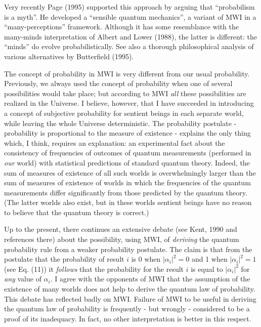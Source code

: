 \documentclass[12pt]{article}
\begin{document}
Very recently Page (1995)  supported this approach by arguing  that
``probabilism is a myth''. He developed a ``sensible quantum
mechanics'', a variant of MWI in a ``many-perceptions'' framework.
Although it has some resemblance with the many-minds interpretation of
Albert and Lower (1988), the latter is different: the
``minds'' do evolve probabilistically. See also a thorough
philosophical analysis of various alternatives by
Butterfield (1995).

        

The concept of probability in MWI is very different from our usual
probability.  Previously, we always used the concept of probability
when one of several possibilities would take place; but according to
MWI {\it all} these possibilities are realized in the Universe.  I
believe, however, that I have succeeded in introducing a concept of
subjective probability for sentient beings in each separate world,
while leaving the whole Universe deterministic.  The probability
postulate - probability is proportional to the measure of existence -
explains the only thing which, I think, requires an explanation: an
experimental fact about the consistency of frequencies of outcomes of
quantum measurements (performed in {\it our} world) with statistical
predictions of standard quantum theory.  Indeed, the sum of measures
of existence of all such worlds is overwhelmingly larger than the sum
of measures of existence of worlds in which the frequencies of the
quantum measurements differ significantly from those predicted by the
quantum theory.  (The latter worlds also exist, but in these worlds
sentient beings have no reason to believe that the quantum theory is
correct.)

Up to the present, there continues an extensive debate (see Kent, 1990
and references there) about the possibility, using MWI, of {\it
  deriving} the quantum probability rule from a weaker probability
postulate.  The claim is that from the postulate that the probability
of result $i$ is 0 when $|\alpha_i|^2 = 0$ and 1 when $|\alpha_i|^2 =
1$ (see Eq.  (11)) it {\it follows} that the probability for the
result $i$ is equal to $|\alpha_i|^2 $ for {\it any} value of
$\alpha_i$.  I agree with the opponents of MWI that the assumption of
the existence of many worlds does not help to derive the quantum law
of probability.  This debate has reflected badly on MWI. Failure of
MWI to be useful in deriving the quantum law of probability is
frequently - but wrongly - considered to be a proof of its inadequacy.
In fact, no other interpretation is better in this respect.
 
\end{document}

